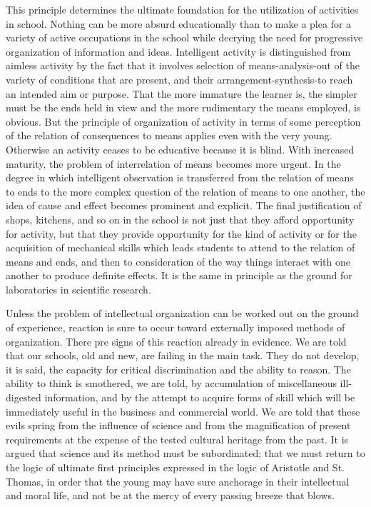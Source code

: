 This principle determines the ultimate foundation for the utilization of activities in 
school. Nothing can be more absurd educationally than to make a plea for a variety of 
active occupations in the school while decrying the need for progressive organization of 
information and ideas. Intelligent activity is distinguished from aimless activity by the 
fact that it involves selection of means-analysis-out of the variety of conditions that are 
present, and their arrangement-synthesis-to reach an intended aim or purpose. That the 
more immature the learner is, the simpler must be the ends held in view and the more 
rudimentary the means employed, is obvious. But the principle of organization of activity 
in terms of some perception of the relation of consequences to means applies even with 
the very young. Otherwise an activity ceases to be educative because it is blind. With 
increased maturity, the problem of interrelation of means becomes more urgent. In the 
degree in which intelligent observation is transferred from the relation of means to ends 
to the more complex question of the relation of means to one another, the idea of cause 
and effect becomes prominent and explicit. The final justification of shops, kitchens, and 
so on in the school is not just that they afford opportunity for activity, but that they 
provide opportunity for the kind of activity or for the acquisition of mechanical skills 
which leads students to attend to the relation of means and ends, and then to 
consideration of the way things interact with one another to produce definite effects. It is 
the same in principle as the ground for laboratories in scientific research. 

Unless the problem of intellectual organization can be worked out on the ground of 
experience, reaction is sure to occur toward externally imposed methods of organization. 
There pre signs of this reaction already in evidence. We are told that our schools, old and 
new, are failing in the main task. They do not develop, it is said, the capacity for critical 
discrimination and the ability to reason. The ability to think is smothered, we are told, by 
accumulation of miscellaneous ill-digested information, and by the attempt to acquire 
forms of skill which will be immediately useful in the business and commercial world. 
We are told that these evils spring from the influence of science and from the 
magnification of present requirements at the expense of the tested cultural heritage from 
the past. It is argued that science and its method must be subordinated; that we must return to the logic of ultimate first principles expressed in the logic of Aristotle and St. 
Thomas, in order that the young may have sure anchorage in their intellectual and moral 
life, and not be at the mercy of every passing breeze that blows. 

